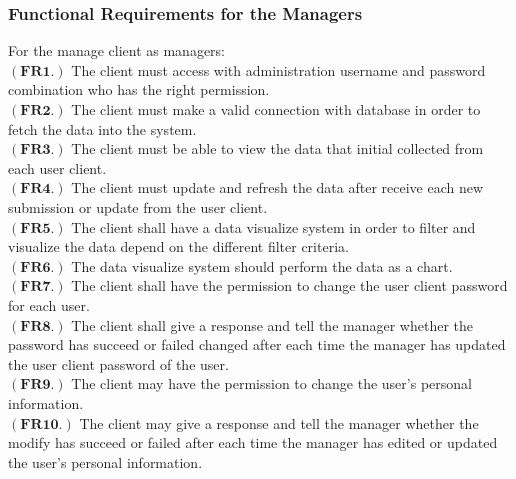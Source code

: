 \documentclass[12pt]{article}
\begin{document}
\subsubsection{Functional Requirements for the Managers}
For the manage client as managers:
\\$\mathbf{(FR1.)}$ The client must access with administration username and password combination who has the right permission.
\\$\mathbf{(FR2.)}$ The client must make a valid connection with database in order to fetch the data into the system.
\\$\mathbf{(FR3.)}$ The client must be able to view the data that initial collected from each user client.
\\$\mathbf{(FR4.)}$ The client must update and refresh the data after receive each new submission or update from the user client.
\\$\mathbf{(FR5.)}$ The client shall have a data visualize system in order to filter and visualize the data depend on the different filter criteria.
\\$\mathbf{(FR6.)}$ The data visualize system should perform the data as a chart.
\\$\mathbf{(FR7.)}$ The client shall have the permission to change the user client password for each user.
\\$\mathbf{(FR8.)}$ The client shall give a response and tell the manager whether the password has succeed or failed changed after each time the manager has updated the user client password of the user.
\\$\mathbf{(FR9.)}$ The client may have the permission to change the user's personal information.
\\$\mathbf{(FR10.)}$ The client may give a response and tell the manager whether the modify has succeed or failed after each time the manager has edited or updated the user's personal information.
\end{document}
